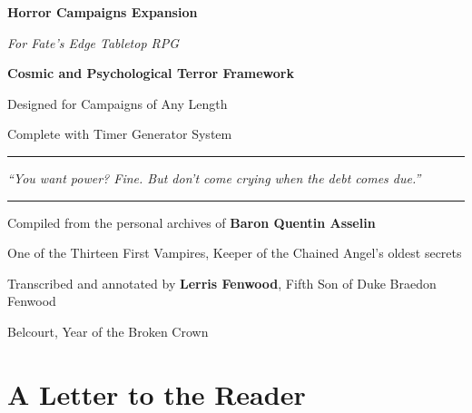 \documentclass[11pt]{article}
\begin{document}
\begin{titlepage}
\centering
\vspace*{1cm}

{\Huge\bfseries\color{bloodcolor} Horror Campaigns Expansion} 

\vspace{0.5cm}

{\Large\itshape For Fate's Edge Tabletop RPG}

\vspace{1cm}

{\Large\bfseries Cosmic and Psychological Terror Framework}

\vspace{0.5cm}

{\large Designed for Campaigns of Any Length}

\vspace{0.5cm}

{\large Complete with Timer Generator System}

\vspace{2cm}

\noindent\rule{\textwidth}{1pt}
\begin{center}
\emph{``You want power? Fine. But don't come crying when the debt comes due.''}
\end{center}
\noindent\rule{\textwidth}{1pt}

\vspace{1cm}

{\large Compiled from the personal archives of \textbf{Baron Quentin Asselin}}

\vspace{0.3cm}
{\large One of the Thirteen First Vampires, Keeper of the Chained Angel's oldest secrets}

\vspace{0.3cm}
{\large Transcribed and annotated by \textbf{Lerris Fenwood}, Fifth Son of Duke Braedon Fenwood}

\vfill

{\small Belcourt, Year of the Broken Crown}
\end{titlepage}

\newpage

\section*{A Letter to the Reader}
\end{document}
